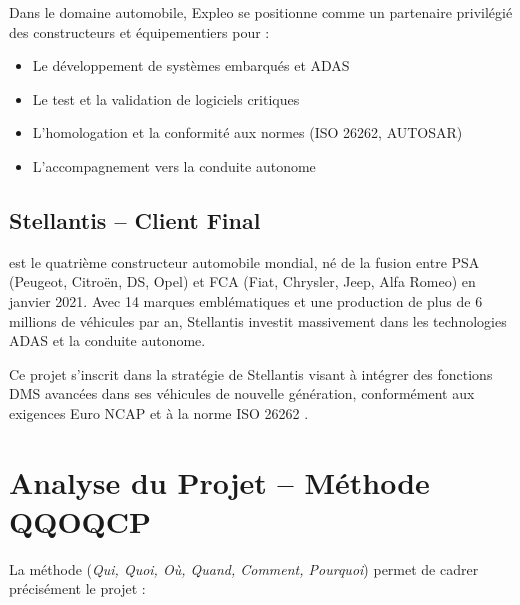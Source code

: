 Dans le domaine automobile, Expleo se positionne comme un partenaire privilégié des constructeurs et équipementiers pour :
\begin{itemize}[leftmargin=2cm]
    \item Le développement de systèmes embarqués et ADAS
    \item Le test et la validation de logiciels critiques
    \item L'homologation et la conformité aux normes (ISO 26262, AUTOSAR)
    \item L'accompagnement vers la conduite autonome
\end{itemize}

\subsection{Stellantis -- Client Final}

 est le quatrième constructeur automobile mondial, né de la fusion entre PSA (Peugeot, Citroën, DS, Opel) et FCA (Fiat, Chrysler, Jeep, Alfa Romeo) en janvier 2021. Avec 14 marques emblématiques et une production de plus de 6 millions de véhicules par an, Stellantis investit massivement dans les technologies ADAS et la conduite autonome.

Ce projet s'inscrit dans la stratégie de Stellantis visant à intégrer des fonctions DMS avancées dans ses véhicules de nouvelle génération, conformément aux exigences Euro NCAP et à la norme ISO 26262 \cite{iso26262}.

\section{Analyse du Projet -- Méthode QQOQCP}

La méthode  (\textit{Qui, Quoi, Où, Quand, Comment, Pourquoi}) permet de cadrer précisément le projet :

